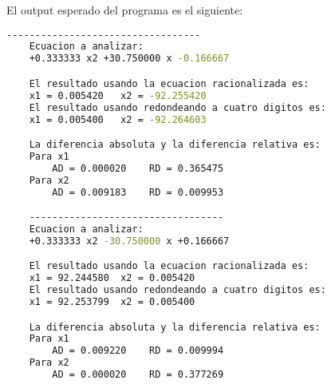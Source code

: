 El output esperado del programa es el siguiente:
\begin{lstlisting}[language=bash]
    ----------------------------------
    Ecuacion a analizar:
    +0.333333 x2 +30.750000 x -0.166667 

    El resultado usando la ecuacion racionalizada es:
    x1 = 0.005420	x2 = -92.255420
    El resultado usando redondeando a cuatro digitos es:
    x1 = 0.005400	x2 = -92.264603

    La diferencia absoluta y la diferencia relativa es:
    Para x1
        AD = 0.000020	 RD = 0.365475 
    Para x2
        AD = 0.009183	 RD = 0.009953 

    ----------------------------------
    Ecuacion a analizar:
    +0.333333 x2 -30.750000 x +0.166667 

    El resultado usando la ecuacion racionalizada es:
    x1 = 92.244580	x2 = 0.005420
    El resultado usando redondeando a cuatro digitos es:
    x1 = 92.253799	x2 = 0.005400

    La diferencia absoluta y la diferencia relativa es:
    Para x1
        AD = 0.009220	 RD = 0.009994 
    Para x2
        AD = 0.000020	 RD = 0.377269 
\end{lstlisting}
